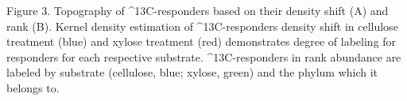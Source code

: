 Figure 3.  Topography of ^{13}C-responders based on their density shift (A) and rank (B). Kernel density estimation of ^{13}C-responders density shift in cellulose treatment (blue) and xylose treatment (red) demonstrates degree of labeling for responders for each respective substrate. ^{13}C-responders in rank abundance are labeled by substrate (cellulose, blue; xylose, green) and the phylum which it belongs to.  
